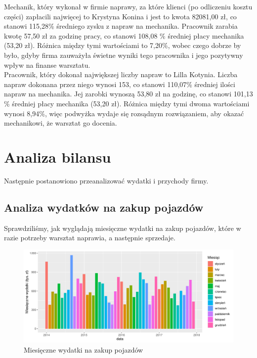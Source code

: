 \documentclass{article}\usepackage[]{graphicx}\usepackage[]{xcolor}
\makeatletter
\def\maxwidth{ %
  \ifdim\Gin@nat@width>\linewidth
    \linewidth
  \else
    \Gin@nat@width
  \fi
}
\newenvironment{knitrout}{}{} %
\makeatother
\begin{document}
Mechanik, który wykonał w firmie naprawy, za które klienci (po odliczeniu kosztu części) zapłacili najwięcej to Krystyna Konina i jest to kwota 82081,00 zł, co stanowi 115,28\% średniego zysku z napraw na mechanika. Pracownik zarabia kwotę 57,50 zł za godzinę pracy, co stanowi 108,08 \% średniej płacy mechanika (53,20 zł). Różnica między tymi wartościami to 7,20\%, wobec czego dobrze by było, gdyby firma zauważyła świetne wyniki tego pracownika i jego pozytywny wpływ na finanse warsztatu. \\

Pracownik, który dokonał największej liczby napraw to Lilla Kotynia. Liczba napraw dokonana przez niego wynosi 153, co stanowi 110,07\% średniej ilości napraw na mechanika. Jej zarobki wynoszą 53,80 zł na godzinę, co stanowi 101,13 \% średniej płacy mechanika (53,20 zł). Różnica między tymi dwoma wartościami wynosi 8,94\%, więc podwyżka wydaje się rozsądnym rozwiązaniem, aby okazać mechanikowi, że warsztat go docenia.

\section{Analiza bilansu}

Następnie postanowiono przeanalizować wydatki i przychody firmy.

\subsection{Analiza wydatków na zakup pojazdów}

Sprawdziliśmy, jak wyglądają miesięczne wydatki na zakup pojazdów, które w razie potrzeby warsztat naprawia, a następnie sprzedaje.

\begin{knitrout}
\color{fgcolor}\begin{figure}[H]

{\centering \includegraphics[width=\maxwidth]{figure/fig_zakup_pojazdu-1} 

}

\caption[Miesięczne wydatki na zakup pojazdów]{Miesięczne wydatki na zakup pojazdów}\label{fig:fig_zakup_pojazdu}
\end{figure}

\end{knitrout}
\end{document}
